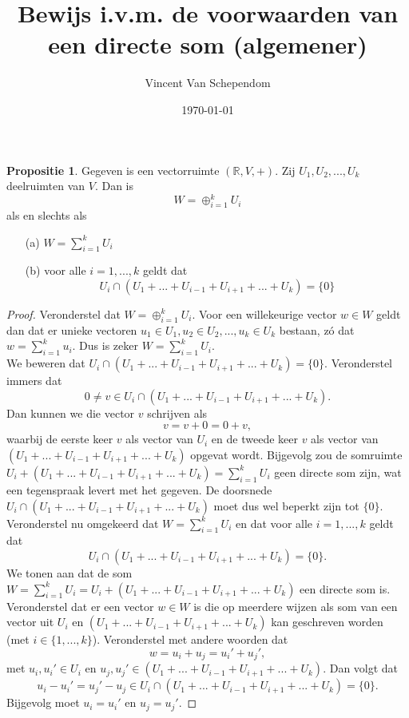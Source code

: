 \documentclass{article}
\title{Bewijs i.v.m. de voorwaarden van een directe som (algemener)}
\author{Vincent Van Schependom}
\date{\today}
\newcommand{\R}{\mathbb{R}} %
\theoremstyle{definition}
\newtheorem*{propositie}{Propositie}
\begin{document}
	
	\maketitle
	
	\begin{propositie}
		Gegeven is een vectorruimte \((\R,V,+)\).
		Zij \(U_1,U_2,...,U_k\) deelruimten van \(V\). Dan is \[W=\oplus_{i=1}^k U_i\] als en slechts als
		\begin{enumerate}
			\item[(a)] \(W=\sum_{i=1}^k U_i\)
			\item[(b)] voor alle \(i=1,...,k\) geldt dat \[U_i \cap (U_1+...+U_{i-1}+U_{i+1}+...+U_k)=\{0\} \]
		\end{enumerate}
	\end{propositie}

	\begin{proof}
		
		Veronderstel dat \(W=\oplus_{i=1}^k U_i\). Voor een willekeurige vector \(w \in W\) geldt dan dat er unieke vectoren
		\(u_1 \in U_1, u_2 \in U_2, ..., u_k \in U_k\) bestaan, zó dat \(w=\sum_{i=1}^{k}u_i\). Dus is zeker \(W = \sum_{i=1}^k U_i\). \\
		
		We beweren dat \(U_i \cap (U_1+...+U_{i-1}+U_{i+1}+...+U_k)=\{0\}\).
		Veronderstel immers dat \[0\neq v \in U_i \cap (U_1+...+U_{i-1}+U_{i+1}+...+U_k).\]
		Dan kunnen we die vector \(v\) schrijven als \[v=v+0=0+v,\] waarbij de eerste
		keer \(v\) als vector van \(U_i\) en de tweede keer \(v\) als vector van \((U_1+...+U_{i-1}+U_{i+1}+...+U_k)\) opgevat wordt. Bijgevolg zou de somruimte \(U_i+(U_1+...+U_{i-1}+U_{i+1}+...+U_k) = \sum_{i=1}^k U_i\) geen directe som zijn, wat een tegenspraak levert met het gegeven. De doorsnede \(U_i \cap (U_1+...+U_{i-1}+U_{i+1}+...+U_k)\) moet dus wel beperkt zijn tot \(\{0\}\). \\
		
		Veronderstel nu omgekeerd dat \(W=\sum_{i=1}^k U_i\) en dat voor alle \(i=1,...,k\) geldt dat \[U_i \cap (U_1+...+U_{i-1}+U_{i+1}+...+U_k)=\{0\}. \]
		We tonen aan dat de som \(W=\sum_{i=1}^k U_i = U_i+(U_1+...+U_{i-1}+U_{i+1}+...+U_k)\) een directe som is. Veronderstel dat er een vector \(w \in W\) is die op meerdere wijzen als som van een vector uit \(U_i\) en \((U_1+...+U_{i-1}+U_{i+1}+...+U_k)\) kan geschreven worden (met \(i \in \{1,...,k\} \)). Veronderstel met andere woorden dat \[w=u_i+u_j=u_i'+u_j',\] met
		\(u_i,u_i' \in U_i\) en \(u_j,u_j' \in (U_1+...+U_{i-1}+U_{i+1}+...+U_k)\). Dan volgt dat \[u_i-u_i'=u_j'-u_j \in U_i \cap (U_1+...+U_{i-1}+U_{i+1}+...+U_k) = \{0\}.\] Bijgevolg moet \(u_i=u_i'\) en \(u_j=u_j'\).
		
	\end{proof}
	
	
\end{document}
